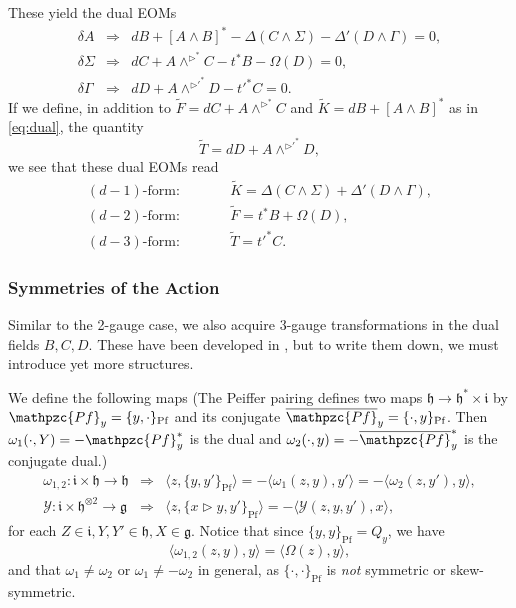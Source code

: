 \documentclass[onecolumn]{article}
\theoremstyle{theorem}
\theoremstyle{remark}
\theoremstyle{example}
\theoremstyle{definition}
\numberwithin{equation}{section}
\begin{document}
These yield the dual EOMs
\begin{eqnarray}
    \delta A &\Rightarrow& dB+[A\wedge B]^* - \Delta(C\wedge\Sigma)-\Delta'(D\wedge \Gamma)=0,\nonumber \\
    \delta \Sigma &\Rightarrow& dC + A\wedge^{\rhd^*} C  -t^*B-\Omega(D)=0,\nonumber\\
    \delta\Gamma &\Rightarrow& dD + A\wedge^{\rhd'^*}D-t'^*C=0 .\nonumber
\end{eqnarray}
{If} we define, in addition to $\tilde F=dC+A\wedge^{\rhd^*}C$ and $\tilde K=dB+[A\wedge B]^*$ as in  \eqref{eq:dual}, the quantity
\begin{equation}
    \tilde T = dD + A\wedge^{\rhd'^*}D,\nonumber
\end{equation}
we see that these dual EOMs read
\begin{eqnarray}
    \text{$(d-1)$-form:}&\qquad& \tilde K = \Delta(C\wedge \Sigma) + \Delta'(D\wedge \Gamma),\nonumber \\ 
    \text{$(d-2)$-form:}&\qquad& \tilde F = t^*B+ \Omega(D),\nonumber\\ 
    \text{$(d-3)$-form:}&\qquad& \tilde T = t'^*C.\label{eq:dual1}
\end{eqnarray}

\subsubsection{Symmetries of the Action} 
Similar to the 2-gauge case, we also acquire 3-gauge transformations in the dual fields $B,C,D$. These have been developed in  \cite{Radenkovic:2019qme}, but to write them down, we must introduce yet more structures. 

We define the following maps {(The Peiffer pairing defines two maps $\mathfrak{h}\rightarrow \mathfrak{h}^*\times\mathfrak{i}$ by $\mathpzc{Pf}_y=\{y,\cdot\}_\text{Pf}$ and its conjugate $\overline{\mathpzc{Pf}}_y=\{\cdot,y\}_\text{Pf}$. Then $\omega_1(\cdot,Y) =-\mathpzc{Pf}_y^*$ is the dual and $\omega_2(\cdot,y)=-\overline{\mathpzc{Pf}}_{y}^*$ is the conjugate dual.)}
\begin{eqnarray}
    \omega_{1,2}: \mathfrak{i}\times \mathfrak{h}\rightarrow \mathfrak{h}&\Rightarrow& \langle z,\{y,y'\}_\text{Pf}\rangle = -\langle \omega_1(z,y),y'\rangle = -\langle\omega_2(z,y'),y\rangle,\nonumber\\ 
    \mathcal{Y}: \mathfrak{i}\times\mathfrak{h}^{\otimes 2}\rightarrow \mathfrak{g} &\Rightarrow& \langle z,\{x\rhd y,y'\}_\text{Pf}\rangle = -\langle \mathcal{Y}(z,y,y'),x\rangle,\nonumber
\end{eqnarray}
for each $Z\in\mathfrak{i},Y,Y'\in\mathfrak{h},X\in\mathfrak{g}$. Notice that since $\{y,y\}_\text{Pf} = Q_y$, we have 
\begin{equation}
    \langle \omega_{1,2}(z,y),y\rangle = \langle \Omega(z),y\rangle,\nonumber
\end{equation}
and that $\omega_1\neq \omega_2$ or $\omega_1 \neq -\omega_2$ in general, as $\{\cdot,\cdot\}_\text{Pf}$ is {\it {not}} symmetric or skew-symmetric.
\end{document}
